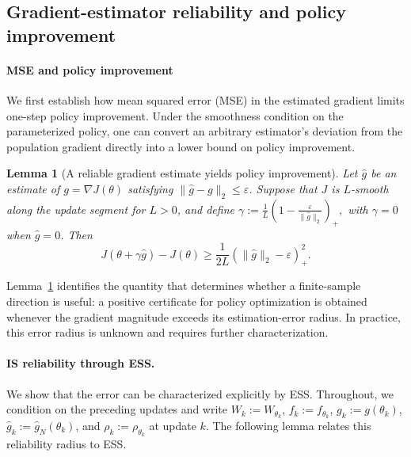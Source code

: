 \documentclass[11pt]{article}
\newtheorem{lemma}[theorem]{Lemma}
\theoremstyle{remark}
\begin{document}
\subsection{Gradient-estimator reliability and policy improvement}
\label{sec:gradient-reliability}

\paragraph{MSE and policy improvement}
We first establish how mean squared error (MSE) in the estimated gradient limits one-step policy improvement. Under the smoothness condition on the parameterized policy, one can convert an arbitrary estimator's deviation from the population gradient directly into a lower bound on policy improvement.

\begin{lemma}[A reliable gradient estimate yields policy improvement]
\label{lem:gradient-error-progress}
Let $\widehat g$ be an estimate of $g=\nabla J(\theta)$ satisfying
$\|\widehat g-g\|_2\le\varepsilon$. Suppose that $J$ is $L$-smooth along the
update segment for $L>0$, and define $ \gamma
 :=
 \frac1L
 \left(
 1-\frac{\varepsilon}{\|\widehat g\|_2}
 \right)_+,$ with $\gamma=0$ when $\widehat g=0$. Then
\begin{equation}
 J(\theta+\gamma\widehat g)-J(\theta)
 \ge
 \frac{1}{2L}
 \left(
 \|\widehat g\|_2-\varepsilon
 \right)_+^2 .
 \label{eq:gradient-error-progress}
\end{equation}
\end{lemma}

Lemma~\ref{lem:gradient-error-progress} identifies the quantity
that determines whether a finite-sample direction is useful: a positive certificate for policy optimization is obtained whenever the gradient magnitude exceeds its estimation-error radius. In practice, this error radius is unknown and requires further characterization.

\paragraph{IS reliability through ESS.}

We show that the error can be characterized explicitly by ESS. Throughout, we condition on the preceding updates and write $W_k:=W_{\theta_k}$, $f_k:=f_{\theta_k}$,
$g_k:=g(\theta_k)$, $\widehat g_k:=\widehat g_N(\theta_k)$, and
$\rho_k:=\rho_{\theta_k}$ at update $k$. The following lemma relates this reliability radius to ESS.
\end{document}
